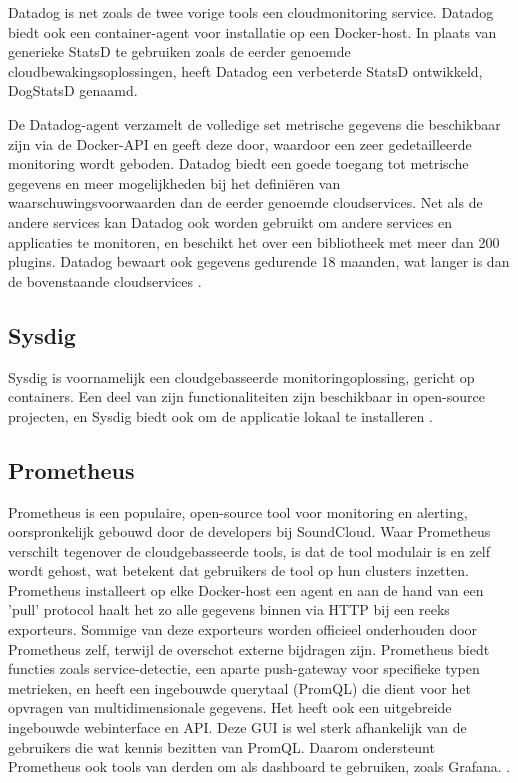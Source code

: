 Datadog is net zoals de twee vorige tools een cloudmonitoring service.  Datadog biedt ook een container-agent voor installatie op een Docker-host. In plaats van generieke StatsD te gebruiken zoals de eerder genoemde cloudbewakingsoplossingen, heeft Datadog een verbeterde StatsD ontwikkeld, DogStatsD genaamd.

De Datadog-agent verzamelt de volledige set metrische gegevens die beschikbaar zijn via de Docker-API en geeft deze door, waardoor een zeer gedetailleerde monitoring wordt geboden. Datadog biedt een goede toegang tot metrische gegevens en meer mogelijkheden bij het definiëren van waarschuwingsvoorwaarden dan de eerder genoemde cloudservices. Net als de andere services kan Datadog ook worden gebruikt om andere services en applicaties te monitoren, en beschikt het over een bibliotheek met meer dan 200 plugins. Datadog bewaart ook gegevens gedurende 18 maanden, wat langer is dan de bovenstaande cloudservices \autocite{Sissons2021}.

\subsection{Sysdig}

Sysdig is voornamelijk een cloudgebasseerde monitoringoplossing, gericht op containers. Een deel van zijn functionaliteiten zijn beschikbaar in open-source projecten, en Sysdig biedt ook om de applicatie lokaal te installeren \autocite{Sissons2021}.

\subsection{Prometheus}

Prometheus is een populaire, open-source tool voor monitoring en alerting, oorspronkelijk gebouwd door de developers bij SoundCloud. Waar Prometheus verschilt tegenover de cloudgebasseerde tools, is dat de tool modulair is en zelf wordt gehost, wat betekent dat gebruikers de tool op hun clusters inzetten. Prometheus installeert op elke Docker-host een agent en aan de hand van een 'pull' protocol haalt het zo alle gegevens binnen via HTTP bij een reeks exporteurs. Sommige van deze exporteurs worden officieel onderhouden door Prometheus zelf, terwijl de overschot externe bijdragen zijn. Prometheus biedt functies zoals service-detectie, een aparte push-gateway voor specifieke typen metrieken, en heeft een ingebouwde querytaal (PromQL) die dient voor het opvragen van multidimensionale gegevens. Het heeft ook een uitgebreide ingebouwde webinterface en API. Deze GUI is wel sterk afhankelijk van de gebruikers die wat kennis bezitten van PromQL. Daarom ondersteunt Prometheus ook tools van derden om als dashboard te gebruiken, zoals Grafana. \autocite{Sissons2021}.  

